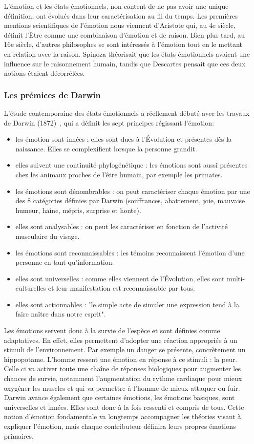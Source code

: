L'émotion et les états émotionnels, non content de ne pas avoir une unique définition, ont évolués dans leur caractérisation au fil du temps. Les premières mentions scientifiques de l'émotion nous viennent d'Aristote qui, au 4e siècle, définit l'Être comme une combinaison d'émotion et de raison. Bien plus tard, au 16e siècle, d'autres philosophes se sont intéressés à l'émotion tout en le mettant en relation avec la raison. Spinoza théorisait que les états émotionnels avaient une influence sur le raisonnement humain, tandis que Descartes pensait que ces deux notions étaient décorrélées.

\subsubsection{Les prémices de Darwin}
L'étude contemporaine des états émotionnels a réellement débuté avec les travaux de Darwin (1872)~\cite{Darwin1872}, qui a définit les sept principes régissant l'émotion:
\begin{itemize}
    \item les émotion sont innées : elles sont dues à l'Évolution et présentes dès la naissance. Elles se complexifient lorsque la personne grandit.
    \item elles suivent une continuité phylogénétique : les émotions sont aussi présentes chez les animaux proches de l'être humain, par exemple les primates.
    \item les émotions sont dénombrables : on peut caractériser chaque émotion par une des 8 catégories définies par Darwin (souffrances, abattement, joie, mauvaise humeur, haine, mépris, surprise et honte).
    \item elles sont analysables : on peut les caractériser en fonction de l'activité musculaire du visage.
    \item les émotions sont reconnaissables : les témoins reconnaissent l'émotion d'une personne en tant qu'information.
    \item elles sont universelles : comme elles viennent de l'Évolution, elles sont multi-culturelles et leur manifestation est reconnaissable par tous.
    \item elles sont actionnables : "le simple acte de simuler une expression tend à la faire naître dans notre esprit".
\end{itemize}
Les émotions servent donc à la survie de l’espèce et sont définies comme adaptatives. En effet, elles permettent d'adopter une réaction appropriée à un stimuli de l'environnement. Par exemple un danger se présente, concrètement un hippopotame. L'homme ressent une émotion en réponse à ce stimuli : la peur. Celle ci va activer toute une chaîne de réponses biologiques pour augmenter les chances de survie, notamment l'augmentation du rythme cardiaque pour mieux oxygéner les muscles et qui va permettre à l'homme de mieux attaquer ou fuir.
Darwin avance également que certaines émotions, les émotions basiques, sont universelles et innées. Elles sont donc à la fois ressenti et compris de tous. Cette notion d'émotion fondamentale va longtemps accompagner les théories visant à expliquer l'émotion, mais chaque contributeur définira leurs propres émotions primaires.

